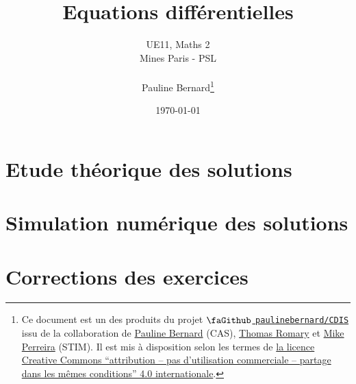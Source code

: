 \documentclass[french,a4paper,11pt,open=any,headings=small]{scrbook}
\title{Equations différentielles}
\author{UE11, Maths 2 \\
	Mines Paris - PSL\\~\\
	Pauline Bernard\footnote{Ce document est un des produits
  du projet \href{https://github.com/}{\(\mbox{\faGithub}\)
  \texttt{paulinebernard/CDIS}} issu de la collaboration de
  \href{mailto:pauline.bernard@minesparis.psl.eu}{Pauline Bernard}
  (CAS), \href{mailto:thomas.romary@minesparis.psl.eu}{Thomas
  Romary} et \href{mailto:mike.perreira@minesparis.psl.eu}{Mike Perreira} (STIM). 
  Il est mis à disposition selon les
  termes de \href{http://creativecommons.org/licenses/by-nc-sa/}{la
  licence Creative Commons ``attribution -- pas d'utilisation
  commerciale -- partage dans les mêmes conditions'' 4.0
  internationale}.}}
\date{\today}
\begin{document}
\maketitle

\setcounter{tocdepth}{2}
\tableofcontents

\part{Etude théorique des solutions}


\part{Simulation numérique des solutions}


\ifcorrections
\part{Corrections des exercices}


\fi
\end{document}
